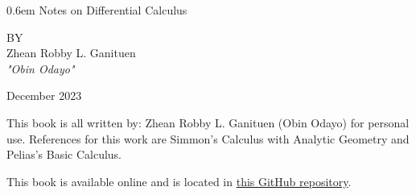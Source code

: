 \documentclass{book}
\newcommand\nbvspace[1][3]{\vspace*{\stretch{#1}}}
\newcommand{\nbtitlestretch}{\spaceskip0.6em}
\begin{document}
{\begin{center}    
    \thispagestyle{empty}
    \Huge
    {\nbtitlestretch\huge
    Notes on Differential Calculus}

    \nbvspace[1]
    \normalsize

    \nbvspace[1]
    \small BY\\
    \Large Zhean Robby L. Ganituen\\[0.5em]
    \tiny\emph{"Obin Odayo"}

    \nbvspace[2]
    \normalsize

    December
    2023
\end{center}}

\newpage

This book is all written by: Zhean Robby L. Ganituen (Obin Odayo) for personal use. References for this work are Simmon's Calculus with Analytic Geometry and Pelias's Basic Calculus.

This book is available online and is located in \href{https://github.com/obin-odayo/Calculus-Notes}{this GitHub repository}.



\tableofcontents


\end{document}
